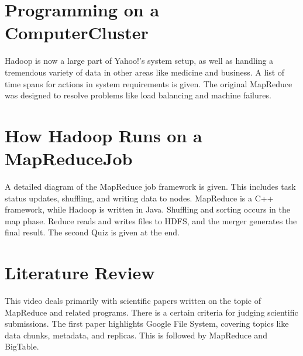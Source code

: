 \section{Programming on a ComputerCluster}

Hadoop is now a large part of Yahoo!'s system setup, as well as handling
a tremendous variety of data in other areas like medicine and business.
A list of time spans for actions in system requirements is given. The
original MapReduce was designed to resolve problems like load balancing
and machine failures.



\section{How Hadoop Runs on a MapReduceJob}

A detailed diagram of the MapReduce job framework is given. This
includes task status updates, shuffling, and writing data to nodes.
MapReduce is a C++ framework, while Hadoop is written in Java. Shuffling
and sorting occurs in the map phase. Reduce reads and writes files to
HDFS, and the merger generates the final result. The second Quiz is
given at the end.



\section{Literature Review}

This video deals primarily with scientific papers written on the topic
of MapReduce and related programs. There is a certain criteria for
judging scientific submissions. The first paper highlights Google File
System, covering topics like data chunks, metadata, and replicas. This
is followed by MapReduce and BigTable.



